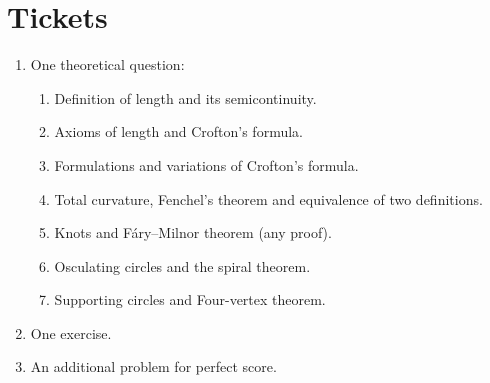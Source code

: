 \chapter{Tickets}


\begin{enumerate}
\item One theoretical question:
\begin{enumerate}
\item Definition of length and its semicontinuity.
\item Axioms of length and Crofton's formula.
\item Formulations and variations of Crofton's formula.
\item Total curvature, Fenchel's theorem and equivalence of two definitions.
\item Knots and F\'ary--Milnor theorem (any proof).
\item Osculating circles and the spiral theorem.
\item Supporting circles and Four-vertex theorem. 
\end{enumerate}

\item One exercise.

\item An additional problem for perfect score.
\end{enumerate}



